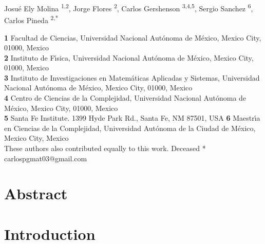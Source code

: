 \documentclass[10pt,letterpaper]{article} %
\begin{document}
\vspace*{0.2in}

\begin{flushleft}
{\Large
	\textbf{} %
}
\newline
Josué Ely Molina  \ddag\textsuperscript{1,2}, %
Jorge Flores      \dag \textsuperscript{2}, %
Carlos Gershenson \textsuperscript{3,4,5},
Sergio Sanchez    \textsuperscript{6},\\
Carlos Pineda     \ddag\textsuperscript{2,*}    %
% 


\bigskip
\newcommand{\unam}{Universidad Nacional Aut\'{o}noma de M\'{e}xico, Mexico City, 01000, Mexico}
\textbf{1} Facultad de Ciencias, \unam \\
\textbf{2} Instituto de F\'{\i}sica, \unam \\
\textbf{3} Instituto de Investigaciones en Matem\'{a}ticas Aplicadas y Sistemas, \unam \\
\textbf{4} Centro de Ciencias de la Complejidad, \unam \\
\textbf{5} Santa Fe Institute. 1399 Hyde Park Rd., Santa Fe, NM 87501, USA
\textbf{6} 
Maestr\'{\i}a en Ciencias de la Complejidad, 
Universidad Aut\'{o}noma de la Ciudad de M\'{e}xico,
Mexico City, Mexico
\\
\bigskip
\ddag These authors also contributed equally to this work.
\dag Deceased
* carlospgmat03@gmail.com
\end{flushleft}
\section*{Abstract} %


\section*{Introduction} %
\end{document}
